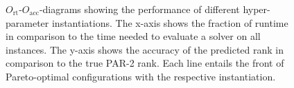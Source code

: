 \documentclass[runningheads]{llncs}
\begin{document}
\begin{figure}[tbp!]
  \caption{$O_{\operatorname{rt}}$-$O_{\operatorname{acc}}$-diagrams showing the performance of different hyper-parameter instantiations. The x-axis shows the fraction of runtime in comparison to the time needed to evaluate a solver on all instances. The y-axis shows the accuracy of the predicted rank in comparison to the true PAR-2 rank. Each line entails the front of Pareto-optimal configurations with the respective instantiation.}
  \label{fig:e2eallsolvers}
\end{figure}

\end{document}
